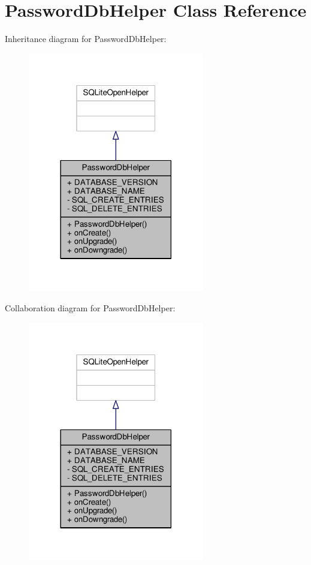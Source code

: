 \hypertarget{a00011}{\section{Password\+Db\+Helper Class Reference}
\label{a00011}
}


Inheritance diagram for Password\+Db\+Helper\+:
\nopagebreak
\begin{figure}[H]
\begin{center}
\leavevmode
\includegraphics[width=218pt]{a00069}
\end{center}
\end{figure}


Collaboration diagram for Password\+Db\+Helper\+:
\nopagebreak
\begin{figure}[H]
\begin{center}
\leavevmode
\includegraphics[width=218pt]{a00070}
\end{center}
\end{figure}
